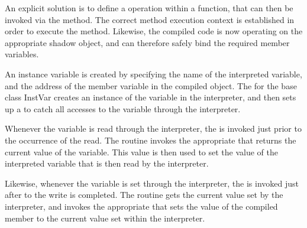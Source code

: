 \documentclass{article}
\begin{document}
An explicit solution is to define a  operation
within a  function, that can then be invoked via the
 method.
The correct method execution context is established in order to execute
the  method.
Likewise, the compiled code is now operating on the appropriate
shadow object, and can therefore safely bind the required member variables.

An instance variable is created by specifying the name of the
interpreted variable, and the address of the member variable in the
compiled object.
The
for the base class InstVar 
creates an instance of the variable in the interpreter,
and then sets up a
to  catch all accesses to the variable through the interpreter.

Whenever the variable is read through the interpreter, the
is invoked just prior to the occurrence of the read.
The routine invokes the appropriate
that returns the current value of the variable.
This value is then used to set the value of the interpreted variable
that is then read by the interpreter.

Likewise,
whenever the variable is set through the interpreter, the
is invoked just after to the write is completed.
The routine gets the current value set by the interpreter, 
and invokes the appropriate
that sets the value of the compiled member to the current value set
within the interpreter.
\end{document}
